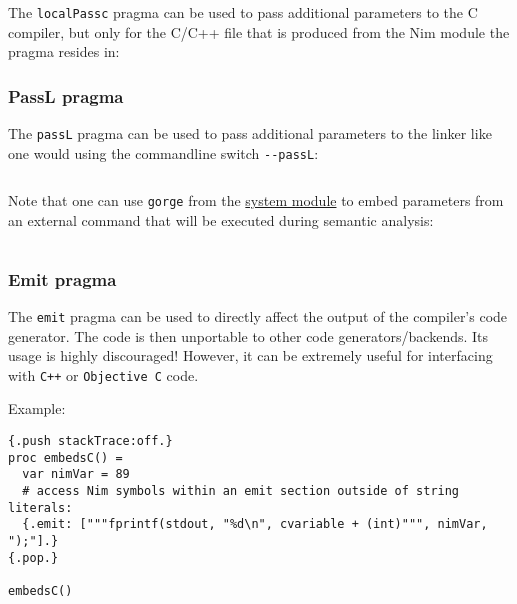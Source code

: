 The \texttt{localPassc} pragma can be used to pass additional parameters
to the C compiler, but only for the C/C++ file that is produced from the
Nim module the pragma resides in:

\begin{Shaded}
\begin{Highlighting}[]

\end{Highlighting}
\end{Shaded}

\hypertarget{passl-pragma}{%
\subsubsection{PassL pragma}\label{passl-pragma}}

The \texttt{passL} pragma can be used to pass additional parameters to
the linker like one would using the commandline switch
\texttt{-\/-passL}:

\begin{verbatim}
\end{verbatim}

Note that one can use \texttt{gorge} from the \href{system.html}{system
module} to embed parameters from an external command that will be
executed during semantic analysis:

\begin{verbatim}
\end{verbatim}

\hypertarget{emit-pragma}{%
\subsubsection{Emit pragma}\label{emit-pragma}}

The \texttt{emit} pragma can be used to directly affect the output of
the compiler's code generator. The code is then unportable to other code
generators/backends. Its usage is highly discouraged! However, it can be
extremely useful for interfacing with \texttt{C++} or
\texttt{Objective\ C} code.

Example:

\begin{verbatim}
{.push stackTrace:off.}
proc embedsC() =
  var nimVar = 89
  # access Nim symbols within an emit section outside of string literals:
  {.emit: ["""fprintf(stdout, "%d\n", cvariable + (int)""", nimVar, ");"].}
{.pop.}

embedsC()
\end{verbatim}

